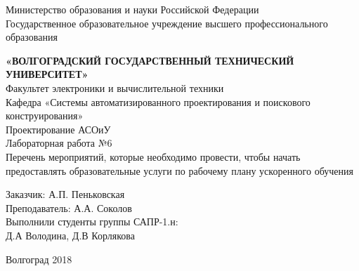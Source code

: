\documentclass[utf8]{article}
\begin{document}
\date{}
\begin{center}
\hfill \break
\large{Министерство образования и науки Российской Федерации}\\

\large{Государственное образовательное учреждение высшего профессионального образования}\\
\hfill \break

\large{\textbf{«ВОЛГОГРАДСКИЙ ГОСУДАРСТВЕННЫЙ ТЕХНИЧЕСКИЙ УНИВЕРСИТЕТ»}}\\
\hfill \break
\normalsize{Факультет электроники и вычислительной техники}\\
 \hfill \break
\normalsize{Кафедра «Системы автоматизированного проектирования и поискового конструирования»}\\
\hfill\break
\hfill \break
\hfill \break
\hfill \break
\large{Проектирование АСОиУ}\\
\hfill \break
\hfill \break
\hfill \break
\normalsize{Лабораторная работа №6}\\
\hfill \break
Перечень мероприятий, которые необходимо провести, чтобы начать предоставлять образовательные услуги   по рабочему плану ускоренного обучения\\
\hfill \break

\hfill \break
\hfill \break
\end{center}
 
\hfill \break
\hfill \break
\hfill \break
\hfill \break
\hfill \break
\hfill \break
\begin{flushright}
\normalsize{ 

Заказчик:  А.П. Пеньковская 
\\
\hfill \break
Преподаватель: А.А. Соколов 
\\
\hfill \break
Выполнили студенты группы САПР-1.н:
\\

Д.А Володина,  Д.В Корлякова  


}
\end{flushright}


\hfill \break
\hfill \break
\hfill \break
\hfill \break
\hfill \break
\hfill \break
\hfill \break
\hfill \break
\hfill \break
\hfill \break


\begin{center} Волгоград 2018 \end{center}
\thispagestyle{empty} 
 
\end{document}
